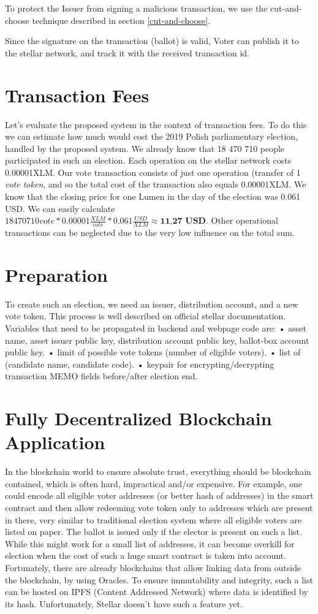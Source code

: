 \documentclass[runningheads]{llncs}
\begin{document}
To protect the Issuer from signing a malicious transaction, we use the cut-and-choose technique described in section \ref{cut-and-choose}.

Since the signature on the transaction (ballot) is valid, Voter can publish it to the stellar network, and track it with the received transaction id.

\section{Transaction Fees}
Let’s evaluate the proposed system in the context of transaction fees. To do this we can estimate how much would cost the 2019 Polish parliamentary election, handled by the proposed system. We already know that 18 470 710 people participated in such an election. Each operation on the stellar network costs 0.00001XLM. Our vote transaction consists of just one operation (transfer of 1 \textit{vote token}, and so the total cost of the transaction also equals 0.00001XLM. We know that the closing price for one Lumen in the day of the election was 0.061 USD. We can easily calculate \(18470710 vote * 0.00001 \frac{XLM}{vote} * 0.061 \frac{USD}{XLM} \approx \textbf{11,27 USD}\). Other operational transactions can be neglected due to the very low influence on the total sum.

\section{Preparation}
To create such an election, we need an issuer, distribution account, and a new vote token. This process is well described on official stellar documentation. Variables that need to be propagated in backend and webpage code are:
• asset name, asset issuer public key, distribution account public key, ballot-box account public key.
• limit of possible vote tokens (number of eligible voters). 
• list of (candidate name, candidate code).
• keypair for encrypting/decrypting transaction MEMO fields before/after election end.

\section{Fully Decentralized Blockchain Application}
In the blockchain world to ensure absolute trust, everything should be blockchain contained, which is often hard, impractical and/or expensive. For example, one could encode all eligible voter addresses (or better hash of addresses) in the smart contract and then allow redeeming vote token only to addresses which are present in there, very similar to traditional election system where all eligible voters are listed on paper. The ballot is issued only if the elector is present on such a list. While this might work for a small list of addresses, it can become overkill for election when the cost of such a huge smart contract is taken into account. Fortunately, there are already blockchains that allow linking data from outside the blockchain, by using Oracles. To ensure immutability and integrity, such a list can be hosted on IPFS (Content Addressed Network) where data is identified by its hash. Unfortunately, Stellar doesn't have such a feature yet.
\end{document}
